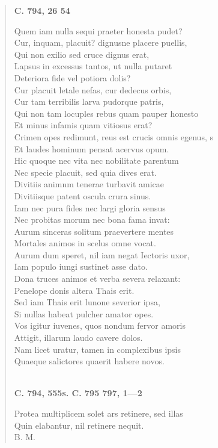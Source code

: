 \documentclass[11pt, a4paper]{report}
\begin{document}
\begin{verse}
    \begin{center} \textbf{C. 794, 26 54} \end{center}Quem iam nulla sequi praeter honesta pudet? \\ Cur, inquam, placuit? dignusne placere puellis, \\ Qui non exilio sed cruce dignus erat, \\ Lapsus in excessus tantos, ut nulla putaret \\ Deteriora fide vel potiora dolis? \\ Cur placuit letale nefas, cur dedecus orbis, \\ Cur tam terribilis larva pudorque patris, \\ Qui non tam locuples rebus quam pauper honesto \\ Et minus infamis quam vitiosus erat? \\ Crimen opes redimunt, reus est crucis omnis egenus, s \\ Et laudes hominum pensat acervus opum. \\ Hic quoque nec vita nec nobilitate parentum \\ Nec specie placuit, sed quia dives erat. \\ Divitiis animnm tenerae turbavit amicae \\ Divitiisque patent oscula crura sinus. \\ Iam nec pura fides nec largi gloria sensus \\ Nec probitas morum nec bona fama invat: \\ Aurum sinceras solitum praevertere mentes \\ Mortales animos in scelus omne vocat. \\ Aurum dum speret, nil iam negat Iectoris uxor, \\ Iam populo iungi sustinet asse dato. \\ Dona truces animos et verba severa relaxant: \\ Penelope donis altera Thais erit. \\ Sed iam Thais erit lunone severior ipsa, \\ Si nullas habeat pulcher amator opes. \\ Vos igitur iuvenes, quos nondum fervor amoris \\ Attigit, illarum laudo cavere dolos. \\ Nam licet uratur, tamen in complexibus ipsis \\ Quaeque salictores quaerit habere novos. \\ 
        ﻿\pagebreak 
    \begin{center} \textbf{C. 794, 555s. C. 795 797, 1—2} \end{center} \marginpar{[273]} Protea multiplicem solet ars retinere, sed illas \\ Quin elabantur, nil retinere nequit. \\ B. M. \\ 
      \end{verse}
  
\end{document}
